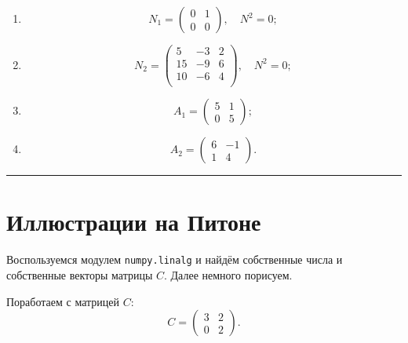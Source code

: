 \documentclass[11pt,a4paper]{article}
\renewcommand{\linethickness}{0.1ex}
\begin{document}
\begin{enumerate}
\def\labelenumi{\arabic{enumi}.}
\item
  \[
  N_1 = 
  \begin{pmatrix}
    0 & 1 \\
    0 & 0
  \end{pmatrix},
  \quad
  N^2 = 0;
  \]
\item
  \[
  N_2 = 
  \begin{pmatrix}
    5  & -3 & 2 \\
    15 & -9 & 6 \\
    10 & -6 & 4 \\
  \end{pmatrix},
  \quad
  N^2 = 0;
  \]
\item
  \[
  A_1 = 
  \begin{pmatrix}
    5 & 1 \\
    0 & 5
  \end{pmatrix};
  \]
\item
  \[
  A_2 = 
  \begin{pmatrix}
    6 & -1 \\
    1 & 4
  \end{pmatrix}.
  \]
\end{enumerate}

    \begin{center}\rule{0.5\linewidth}{\linethickness}\end{center}

    \hypertarget{ux438ux43bux43bux44eux441ux442ux440ux430ux446ux438ux438-ux43dux430-ux43fux438ux442ux43eux43dux435}{%
\section{Иллюстрации на
Питоне}\label{ux438ux43bux43bux44eux441ux442ux440ux430ux446ux438ux438-ux43dux430-ux43fux438ux442ux43eux43dux435}}

Воспользуемся модулем \texttt{numpy.linalg} и найдём собственные числа и
собственные векторы матрицы \(C\). Далее немного порисуем.

Поработаем с матрицей \(C\): \[
  C = 
  \begin{pmatrix}
    3 & 2 \\
    0 & 2
  \end{pmatrix}.
\]

    \begin{center}
    \end{center}
    { \hspace*{\fill} \\}
    
\end{document}
